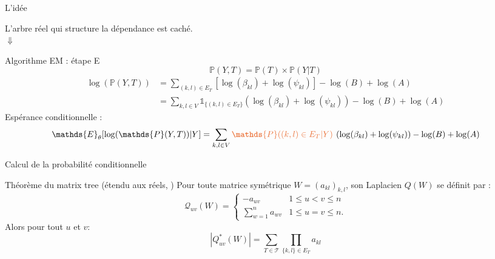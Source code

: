 \documentclass{bredelebeamer}
\begin{document}
\begin{frame}{L'idée}
\begin{center}
L'arbre réel qui structure la dépendance est caché.\\
\vspace{0.5cm}
    \Huge{$\Downarrow$}
    \vspace{0.5cm}
\end{center}

    
\end{frame}
\begin{frame}{Algorithme EM : étape E}
\boiteverte{\[ \log(p_\theta (Y) )= \mathds{E}_\theta \left(\log(p_\theta (Y,Z))|Y \right) \underbrace{- \mathds{E}_\theta \left(\log(p_\theta (Y|Z))|Y \right)}_{\text{\normalsize{$\mathcal{H}(p_\theta (Y|Z))$}}} \]
}
 \[ \mathds{P}(Y,T) = \mathds{P}(T)\times\mathds{P}(Y|T)\]
\begin{align*}
 \log(\mathds{P}(Y,T)) &= \sum_{(k,l)\in E_T} \left[ \log(\beta_{kl}) + \log(\psi_{kl})  \right] -\log(B)+\log(A) \\
 &= \sum_{k,l\in V} \mathds{1}_{\{(k,l) \in E_T\}} (\log(\beta_{kl}) + \log(\psi_{kl}) ) -\log(B) +\log(A)
 \end{align*}
  Espérance conditionnelle :
\[ \mathds{E}_\theta[\log(\mathds{P}(Y,T))|Y] =\sum_{k,l\in V} \emph{$\mathds{P}((k,l) \in E_T|Y)$ }(\log(\beta_{kl}) + \log(\psi_{kl}) ) -\log(B) +\log(A)\]
    
\end{frame}


\begin{frame}{Calcul de la probabilité conditionnelle}
\begin{exampleblock}{Théorème du matrix tree (étendu aux réels, \cite{MixtTrees})}
Pour toute matrice symétrique $W=(a_{kl})_{k,l}$, son Laplacien $Q(W)$ se définit par :
 \[\mathcal{Q}_{uv}(W)=
 \begin{cases}
     -a_{uv} & 1\leq u<v \leq n\\
    \sum_{w=1}^n a_{wv} & 1\leq u=v \leq n.
\end{cases}
\]
Alors pour tout $u$ et $v$:
    \[ |Q^*_{uv}(W)|=\sum_{T\in\mathcal{T}} \prod_{\{k,l\}\in E_T} a_{kl} \]
\end{exampleblock}
\end{frame}
\end{document}
